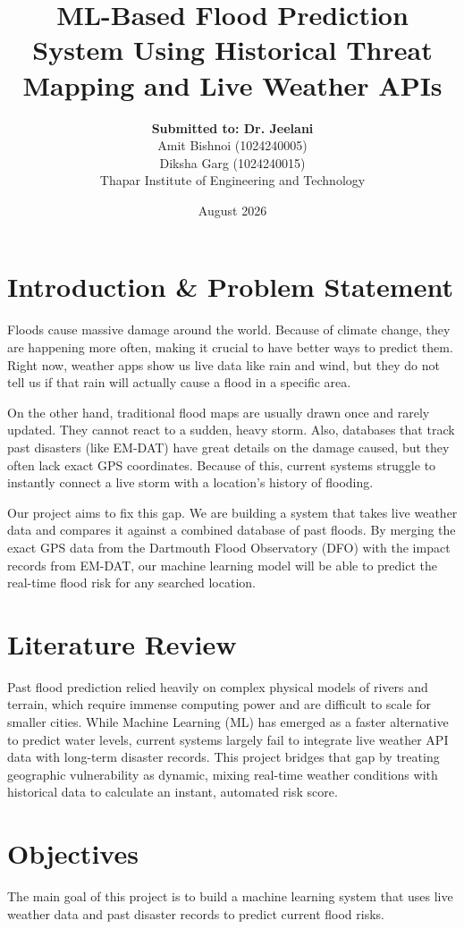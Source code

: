\documentclass[11pt,a4paper]{article}
\title{\textbf{ML-Based Flood Prediction System Using Historical Threat Mapping and Live Weather APIs}}
\author{
    \textbf{Submitted to: Dr. Jeelani} \\[0.5cm]
    Amit Bishnoi (1024240005) \\
    Diksha Garg (1024240015) \\[0.5cm]
    Thapar Institute of Engineering and Technology
}
\date{August 2026}
\begin{document}
\maketitle

\section{Introduction \& Problem Statement}
Floods cause massive damage around the world. Because of climate change, they are happening more often, making it crucial to have better ways to predict them. Right now, weather apps show us live data like rain and wind, but they do not tell us if that rain will actually cause a flood in a specific area. 

On the other hand, traditional flood maps are usually drawn once and rarely updated. They cannot react to a sudden, heavy storm. Also, databases that track past disasters (like EM-DAT) have great details on the damage caused, but they often lack exact GPS coordinates. Because of this, current systems struggle to instantly connect a live storm with a location's history of flooding.

Our project aims to fix this gap. We are building a system that takes live weather data and compares it against a combined database of past floods. By merging the exact GPS data from the Dartmouth Flood Observatory (DFO) with the impact records from EM-DAT, our machine learning model will be able to predict the real-time flood risk for any searched location.

\section{Literature Review}
Past flood prediction relied heavily on complex physical models of rivers and terrain, which require immense computing power and are difficult to scale for smaller cities. While Machine Learning (ML) has emerged as a faster alternative to predict water levels, current systems largely fail to integrate live weather API data with long-term disaster records. This project bridges that gap by treating geographic vulnerability as dynamic, mixing real-time weather conditions with historical data to calculate an instant, automated risk score.

\section{Objectives}
The main goal of this project is to build a machine learning system that uses live weather data and past disaster records to predict current flood risks.
\end{document}
